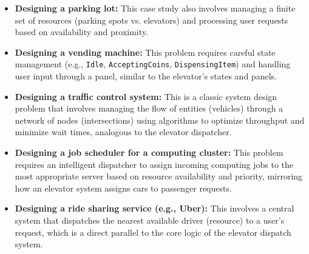 \begin{itemize}
\item
\protect{}\label{X5yVy2xFiwHsq2CY8W1tC}
\textbf{Designing a parking lot:} This case study also involves managing a finite set of resources (parking spots vs. elevators) and processing user requests based on availability and proximity.
\item
\protect{}\label{ebyMM0i_2RIXnoAPQpcir}
\textbf{Designing a vending machine:} This problem requires careful state management (e.g., \texttt{Idle}, \texttt{AcceptingCoins}, \texttt{DispensingItem}) and handling user input through a panel, similar to the elevator's states and panels.
\item
\protect{}\label{nqQk1DiM5CfeJI7iiy0ci}
\textbf{Designing a traffic control system:} This is a classic system design problem that involves managing the flow of entities (vehicles) through a network of nodes (intersections) using algorithms to optimize throughput and minimize wait times, analogous to the elevator dispatcher.
\item
\protect{}\label{KO3XLzkuWzOPUvuIXxjad}
\textbf{Designing a job scheduler for a computing cluster:} This problem requires an intelligent dispatcher to assign incoming computing jobs to the most appropriate server based on resource availability and priority, mirroring how an elevator system assigns cars to passenger requests.
\item
\protect{}\label{e6d0GEirnY8clgDmhHCf3}
\textbf{Designing a ride sharing service (e.g., Uber):} This involves a central system that dispatches the nearest available driver (resource) to a user's request, which is a direct parallel to the core logic of the elevator dispatch system.
\end{itemize}

